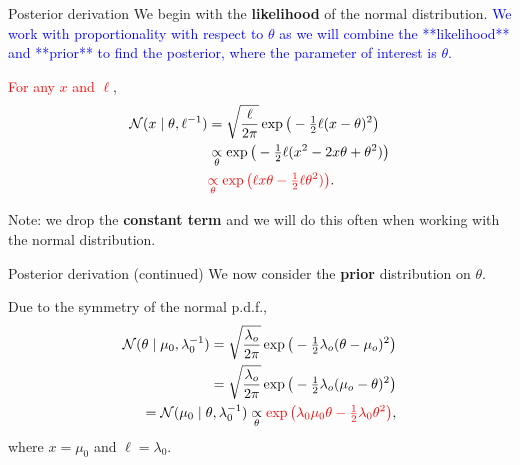 \documentclass[
  ignorenonframetext,
]{beamer}
\newcommand{\N}{\mathcal{N}}
\begin{document}
\begin{frame}{Posterior derivation}
\protect\hypertarget{posterior-derivation}{}
We begin with the \textbf{likelihood} of the normal distribution.
\textcolor{blue}{We work with proportionality with respect to $\theta$ as we will combine the **likelihood** and **prior** to find the posterior, where the parameter of interest is $\theta.$}

\textcolor{red}{For any $x$ and $\ell$},
\begin{align}\label{equation:prop}
\N(x\mid\theta,\ell^{-1})
& =\sqrt{\frac{\ell}{2\pi}}\exp\big(-\tfrac{1}{2}\ell (x-\theta)^2\big)\notag\\
&\underset{\theta}{\propto} \exp\big(-\tfrac{1}{2}\ell (x^2 - 2 x \theta +\theta^2)\big)\notag\\
&\textcolor{red}{\underset{\theta}{\propto} \exp\big(\ell x \theta -\tfrac{1}{2}\ell\theta^2)\big)}.
\end{align}

Note: we drop the \textbf{constant term} and we will do this often when
working with the normal distribution.
\end{frame}

\begin{frame}{Posterior derivation (continued)}
\protect\hypertarget{posterior-derivation-continued}{}
We now consider the \textbf{prior} distribution on \(\theta.\)

Due to the symmetry of the normal p.d.f.,
\begin{align}\label{equation:prior}
\N(\theta\mid\mu_0,\lambda_0^{-1}) =
\sqrt{\frac{\lambda_o}{2\pi}}\exp\big(-\tfrac{1}{2}\lambda_o (\theta - \mu_o)^2\big)\notag\\
= \sqrt{\frac{\lambda_o}{2\pi}}\exp\big(-\tfrac{1}{2}\lambda_o (\mu_o - \theta)^2\big)\notag\\
= \N(\mu_0\mid\theta,\lambda_0^{-1})
\underset{\theta}{\propto}\textcolor{red}{\exp\big(\lambda_0\mu_0\theta-\tfrac{1}{2}\lambda_0\theta^2\big)},
\end{align} where \(x=\mu_0\) and \(\ell=\lambda_0\).
\end{frame}
\end{document}
